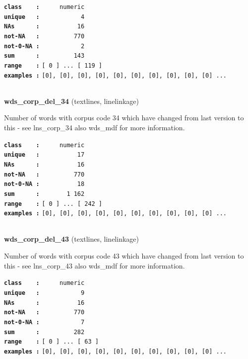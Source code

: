 \documentclass[]{article}
\begin{document}
\textbf{\texttt{class\ \ \ \ :}} \texttt{~~~~~numeric}\\
\textbf{\texttt{unique\ \ \ :}} \texttt{~~~~~~~~~~~4}\\
\textbf{\texttt{NAs\ \ \ \ \ \ :}} \texttt{~~~~~~~~~~16}\\
\textbf{\texttt{not-NA\ \ \ :}} \texttt{~~~~~~~~~770}\\
\textbf{\texttt{not-0-NA\ :}} \texttt{~~~~~~~~~~~2}\\
\textbf{\texttt{sum\ \ \ \ \ \ :}} \texttt{~~~~~~~~~143}\\
\textbf{\texttt{range\ \ \ \ :}}
\texttt{{[}\ 0\ {]}\ ...\ {[}\ 119\ {]}}\\
\textbf{\texttt{examples\ :}}
\texttt{{[}0{]},\ {[}0{]},\ {[}0{]},\ {[}0{]},\ {[}0{]},\ {[}0{]},\ {[}0{]},\ {[}0{]},\ {[}0{]},\ {[}0{]}\ ...}\\

~

\textbf{wds\_corp\_del\_34} (textlines, linelinkage)

Number of words with corpus code 34 which have changed from last version
to this - see lns\_corp\_34 also wds\_mdf for more information.

\textbf{\texttt{class\ \ \ \ :}} \texttt{~~~~~numeric}\\
\textbf{\texttt{unique\ \ \ :}} \texttt{~~~~~~~~~~17}\\
\textbf{\texttt{NAs\ \ \ \ \ \ :}} \texttt{~~~~~~~~~~16}\\
\textbf{\texttt{not-NA\ \ \ :}} \texttt{~~~~~~~~~770}\\
\textbf{\texttt{not-0-NA\ :}} \texttt{~~~~~~~~~~18}\\
\textbf{\texttt{sum\ \ \ \ \ \ :}} \texttt{~~~~~~~1~162}\\
\textbf{\texttt{range\ \ \ \ :}}
\texttt{{[}\ 0\ {]}\ ...\ {[}\ 242\ {]}}\\
\textbf{\texttt{examples\ :}}
\texttt{{[}0{]},\ {[}0{]},\ {[}0{]},\ {[}0{]},\ {[}0{]},\ {[}0{]},\ {[}0{]},\ {[}0{]},\ {[}0{]},\ {[}0{]}\ ...}\\

~

\textbf{wds\_corp\_del\_43} (textlines, linelinkage)

Number of words with corpus code 43 which have changed from last version
to this - see lns\_corp\_43 also wds\_mdf for more information.

\textbf{\texttt{class\ \ \ \ :}} \texttt{~~~~~numeric}\\
\textbf{\texttt{unique\ \ \ :}} \texttt{~~~~~~~~~~~9}\\
\textbf{\texttt{NAs\ \ \ \ \ \ :}} \texttt{~~~~~~~~~~16}\\
\textbf{\texttt{not-NA\ \ \ :}} \texttt{~~~~~~~~~770}\\
\textbf{\texttt{not-0-NA\ :}} \texttt{~~~~~~~~~~~7}\\
\textbf{\texttt{sum\ \ \ \ \ \ :}} \texttt{~~~~~~~~~282}\\
\textbf{\texttt{range\ \ \ \ :}}
\texttt{{[}\ 0\ {]}\ ...\ {[}\ 63\ {]}}\\
\textbf{\texttt{examples\ :}}
\texttt{{[}0{]},\ {[}0{]},\ {[}0{]},\ {[}0{]},\ {[}0{]},\ {[}0{]},\ {[}0{]},\ {[}0{]},\ {[}0{]},\ {[}0{]}\ ...}\\
\end{document}
